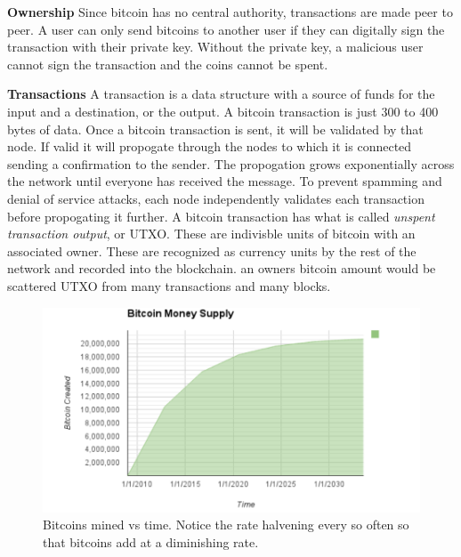 \documentclass[conference]{IEEEtran}
\begin{document}
\textbf{Ownership} Since bitcoin has no central authority, transactions are made peer to peer. A user can only send bitcoins to another user if they can digitally sign the transaction with their private key. Without the private key, a malicious user cannot sign the transaction and the coins cannot be spent. 

\textbf{Transactions} A transaction is a data structure with a source of funds for the input and a destination, or the output. A bitcoin transaction is just 300 to 400 bytes of data. Once a bitcoin transaction is sent, it will be validated by that node. If valid it will propogate through the nodes to which it is connected sending a confirmation to the sender. The propogation grows exponentially across the network until everyone has received the message. To prevent spamming and denial of service attacks, each node independently validates each transaction before propogating it further. A bitcoin transaction has what is called \textit{unspent transaction output}, or UTXO. These are indivisble units of bitcoin with an associated owner. These are recognized as currency units by the rest of the network and recorded into the blockchain. an owners bitcoin amount would be scattered UTXO from many transactions and many blocks. 

\begin{figure}[ht!]
\includegraphics[scale=.3]{./IMG/bitcoin_rate.png} 
\caption{Bitcoins mined vs time. Notice the rate halvening every so often so that bitcoins add at a diminishing rate.}
\end{figure}
\end{document}
